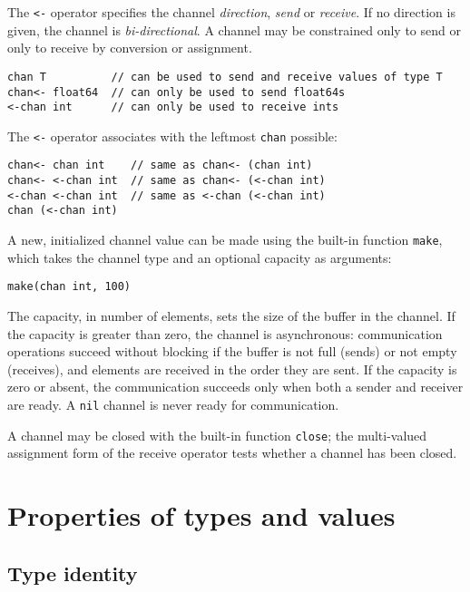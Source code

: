 The \texttt{\textless{}-} operator specifies the channel
\emph{direction}, \emph{send} or \emph{receive}. If no direction is
given, the channel is \emph{bi-directional}. A channel may be
constrained only to send or only to receive by
conversion or
assignment.

\begin{Verbatim}[frame=single]
chan T          // can be used to send and receive values of type T
chan<- float64  // can only be used to send float64s
<-chan int      // can only be used to receive ints
\end{Verbatim}

The \texttt{\textless{}-} operator associates with the leftmost
\texttt{chan} possible:

\begin{Verbatim}[frame=single]
chan<- chan int    // same as chan<- (chan int)
chan<- <-chan int  // same as chan<- (<-chan int)
<-chan <-chan int  // same as <-chan (<-chan int)
chan (<-chan int)
\end{Verbatim}

A new, initialized channel value can be made using the built-in function
\texttt{make}, which
takes the channel type and an optional capacity as arguments:

\begin{Verbatim}[frame=single]
make(chan int, 100)
\end{Verbatim}

The capacity, in number of elements, sets the size of the buffer in the
channel. If the capacity is greater than zero, the channel is
asynchronous: communication operations succeed without blocking if the
buffer is not full (sends) or not empty (receives), and elements are
received in the order they are sent. If the capacity is zero or absent,
the communication succeeds only when both a sender and receiver are
ready. A \texttt{nil} channel is never ready for communication.

A channel may be closed with the built-in function
\texttt{close}; the multi-valued assignment form of
the receive operator tests whether a
channel has been closed.

\section*{Properties of types and values}

\subsection*{Type identity}

